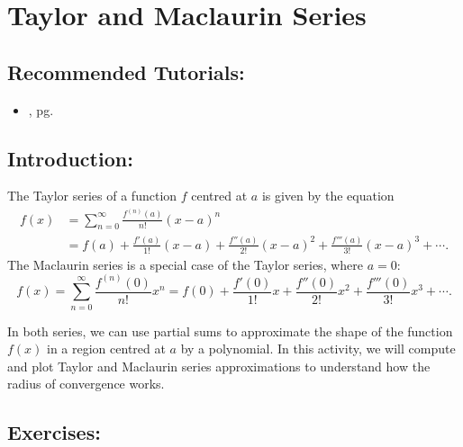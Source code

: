 \section{Taylor and Maclaurin Series}
\label{sec:taylor_series}	

\subsection*{Recommended Tutorials:}
\begin{itemize}[noitemsep]
	\item {}, pg. \pageref{chp:sequence_and_sseries}  
\end{itemize}

\subsection*{Introduction:}
The Taylor series of a function $f$ centred at $a$ is given by the equation
\begin{align*}
f(x) 
&= \sum_{n=0}^{\infty} \frac{f^{(n)}(a)}{n!}(x-a)^n\\
&= f(a) + \frac{f'(a)}{1!}(x-a) + \frac{f''(a)}{2!}(x-a)^2 + \frac{f'''(a)}{3!}(x-a)^3 + \cdots.
\end{align*}
The Maclaurin series is a special case of the Taylor series, where $a=0$:
\[
f(x) 
= \sum_{n=0}^{\infty} \frac{f^{(n)}(0)}{n!}x^n 
= f(0) + \frac{f'(0)}{1!}x + \frac{f''(0)}{2!}x^2 + \frac{f'''(0)}{3!}x^3 + \cdots.
\]

In both series, we can use partial sums to approximate the shape of the function $f(x)$ in a region centred at $a$ by a polynomial. In this activity, we will compute and plot Taylor and Maclaurin series approximations to understand how the radius of convergence works.

\subsection*{Exercises:}


